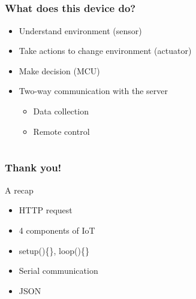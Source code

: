 \documentclass[compress, aspectratio=32]{beamer}
\begin{document}
\subsection*{}
\begin{frame}
    \frametitle{What does this device do?}
    \begin{itemize}
        \item Understand environment (sensor)
        \item Take actions to change environment (actuator)
        \item Make decision (MCU)
        \item Two-way communication with the server
        \begin{itemize}
            \item Data collection
            \item Remote control
        \end{itemize}
    \end{itemize}
\end{frame}

\section*{}
\begin{frame}
    \frametitle{Thank you!}
    A recap
    \begin{itemize}
        \item HTTP request
        \item 4 components of IoT
        \item setup()\{\}, loop()\{\}
        \item Serial communication
        \item JSON 
    \end{itemize}
\end{frame}
\end{document}
